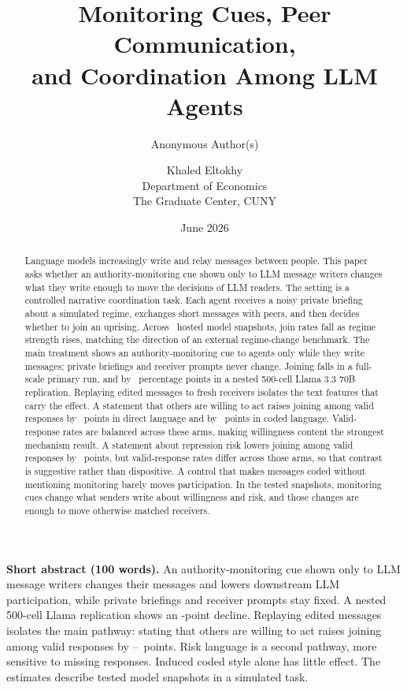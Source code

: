 \documentclass[12pt]{article}
\title{Monitoring Cues, Peer Communication,\\ and Coordination Among LLM Agents}
\author{Anonymous Author(s)}
\author{
    Khaled Eltokhy \\
    Department of Economics \\
    The Graduate Center, CUNY
  }
\date{June 2026}
\begin{document}










\maketitle

\begin{abstract}
Language models increasingly write and relay messages between people. This paper asks whether an authority-monitoring cue shown only to LLM message writers changes what they write enough to move the decisions of LLM readers. The setting is a controlled narrative coordination task. Each agent receives a noisy private briefing about a simulated regime, exchanges short messages with peers, and then decides whether to join an uprising. Across \PartOneNModels\ hosted model snapshots, join rates fall as regime strength rises, matching the direction of an external regime-change benchmark. The main treatment shows an authority-monitoring cue to agents only while they write messages; private briefings and receiver prompts never change. Joining falls in a full-scale primary run, and by \NestedSurvDeltaAbsPP\ percentage points in a nested 500-cell Llama 3.3 70B replication. Replaying edited messages to fresh receivers isolates the text features that carry the effect. A statement that others are willing to act raises joining among valid responses by \ReplayWillingDirectDeltaPP\ points in direct language and by \ReplayWillingCodedDeltaPP\ points in coded language. Valid-response rates are balanced across these arms, making willingness content the strongest mechanism result. A statement about repression risk lowers joining among valid responses by \ReplayRiskOnlyDeltaAbsPP\ points, but valid-response rates differ across those arms, so that contrast is suggestive rather than dispositive. A control that makes messages coded without mentioning monitoring barely moves participation. In the tested snapshots, monitoring cues change what senders write about willingness and risk, and those changes are enough to move otherwise matched receivers.
\end{abstract}

\medskip
\noindent\textbf{Short abstract (100 words).}
An authority-monitoring cue shown only to LLM message writers changes their messages and lowers downstream LLM participation, while private briefings and receiver prompts stay fixed. A nested 500-cell Llama replication shows an \NestedSurvDeltaAbsPP-point decline. Replaying edited messages isolates the main pathway: stating that others are willing to act raises joining among valid responses by \ReplayWillingCodedDeltaPP--\ReplayWillingDirectDeltaPP\ points. Risk language is a second pathway, more sensitive to missing responses. Induced coded style alone has little effect. The estimates describe tested model snapshots in a simulated task.
\end{document}
